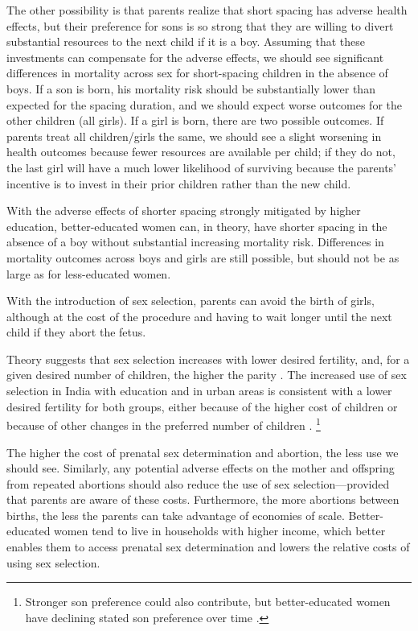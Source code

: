 \documentclass[12pt,letterpaper]{article}
\begin{document}
The other possibility is that parents realize that short spacing has adverse 
health effects, but their preference for sons is so strong that they are willing to 
divert substantial resources to the next child if it is a boy.
Assuming that these investments can compensate for the adverse effects,
we should see significant differences in mortality across sex for short-spacing 
children in the absence of boys.
If a son is born, his mortality risk should be substantially lower than expected 
for the spacing duration, and we should expect worse outcomes for the other 
children (all girls).
If a girl is born, there are two possible outcomes.
If parents treat all children/girls the same, we should see a slight worsening in 
health outcomes because fewer resources are available per child; 
if they do not, the last girl will have a much lower likelihood of surviving 
because the parents' incentive is to invest in their prior children rather than 
the new child.

With the adverse effects of shorter spacing strongly mitigated by higher education,
better-educated women can, in theory, have shorter spacing in the absence of a boy 
without substantial increasing mortality risk.
Differences in mortality outcomes across boys and girls are still possible,
but should not be as large as for less-educated women.

With the introduction of sex selection, parents can avoid the birth of girls, 
although at the cost of the procedure and having to wait longer until 
the next child if they abort the fetus.

Theory suggests that sex selection increases with lower desired fertility, and, for a 
given desired number of children, the higher the parity \citep{Portner2015b}.
The increased use of sex selection in India with education and in urban
areas is consistent with a lower desired fertility for both groups,
either because of the higher cost of children or because of other
changes in the preferred number of children
\citep{das_gupta97,retherford03b,jha06,Guilmoto2009a,Bongaarts2013,Portner2015b,
Jayachandran2017}.%
\footnote{
Stronger son preference could also contribute, but better-educated women 
have declining stated son preference over time \citep{bhat03,pande07}.
}

The higher the cost of prenatal sex determination and abortion, the less use we should 
see.
Similarly, any potential adverse effects on the mother and offspring 
from repeated abortions should also reduce the use of sex selection---provided that 
parents are aware of these costs.
Furthermore, the more abortions between births, the less the parents can take advantage 
of economies of scale.
Better-educated women tend to live in households with higher income, which better enables 
them to access prenatal sex determination and lowers the relative costs of using sex 
selection.
\end{document}
